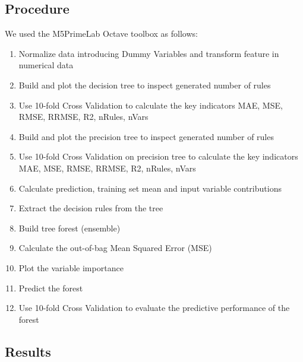 \documentclass{article}
\begin{document}
\subsection{Procedure}
We used the M5PrimeLab Octave toolbox as follows:
\begin{enumerate}  
	\item Normalize data introducing Dummy Variables and transform feature in numerical data
	\item Build and plot the decision tree to inspect generated number of rules
	\item Use 10-fold Cross Validation to calculate the key indicators MAE, MSE, RMSE, RRMSE, R2, nRules, nVars
	\item Build and plot the precision tree to inspect generated number of rules
	\item Use 10-fold Cross Validation on precision tree to calculate the key indicators MAE, MSE, RMSE, RRMSE, R2, nRules, nVars
	\item Calculate prediction, training set mean and input variable contributions
	\item Extract the decision rules from the tree
	\item Build tree forest (ensemble) 
	\item Calculate the out-of-bag Mean Squared Error (MSE) 
	\item Plot the variable importance
	\item Predict the forest
	\item Use 10-fold Cross Validation to evaluate the predictive performance of the forest
\end{enumerate}

\subsection{Results}
\end{document}
